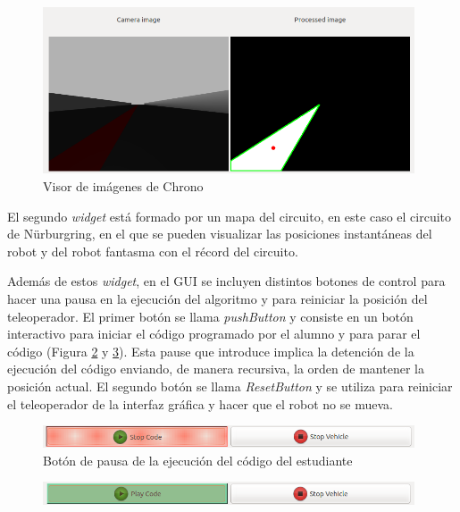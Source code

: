 \begin{figure}[H]
  \begin{center}
    \includegraphics[width=0.98\textwidth]{figures/visor_imagen_chrono.png}
		\caption{Visor de imágenes de Chrono}
		\label{fig.vich}
		\end{center}
\end{figure}

El segundo \textit{widget} está formado por un mapa del circuito, en este caso el circuito de Nürburgring, en el que se pueden visualizar las posiciones instantáneas del robot y del robot fantasma con el récord del circuito.

Además de estos \textit{widget}, en el GUI se incluyen distintos botones de control para hacer una pausa en la ejecución del algoritmo y para reiniciar la posición del teleoperador. El primer botón se llama \textit{pushButton} y consiste en un botón interactivo para iniciar el código programado por el alumno y para parar el código (Figura \ref{fig.bpch} y \ref{fig.bsch}). Esta pause que introduce implica la detención de la ejecución del código enviando, de manera recursiva, la orden de mantener la posición actual. El segundo botón se llama \textit{ResetButton} y se utiliza para reiniciar el teleoperador de la interfaz gráfica y hacer que el robot no se mueva.

\begin{figure}[H]
	\begin{center}
	    \includegraphics[width=0.98\textwidth]{figures/boton_pausa_chrono.png}
		\caption{Botón de pausa de la ejecución del código del estudiante}
		\label{fig.bpch}
	\end{center}
\end{figure}
\begin{figure}[H]
	\begin{center}
        \includegraphics[width=0.98\textwidth]{figures/boton_start_chrono.png}
		\label{fig.bsch}
	\end{center}
\end{figure}

